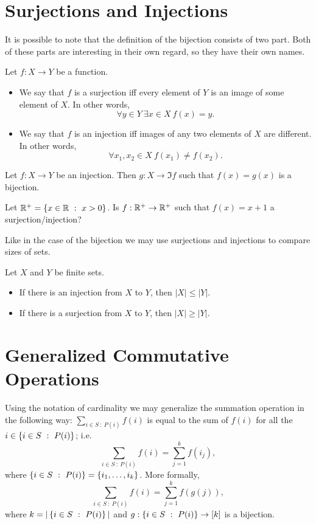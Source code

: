 \section{Surjections and Injections}

It is possible to note that the definition of the bijection consists of two part.
Both of these parts are interesting in their own regard, so they have their own
names.
\begin{definition}
    Let $f : X \to Y$ be a function.
    \begin{itemize}
        \item We say that $f$ is a surjection iff every element of $Y$ is an image
            of some element of $X$. In other words,
            \[
                \forall y \in Y~\exists x \in X\ f(x) = y.
            \]
        \item We say that $f$ is an injection iff images of any two elements
            of $X$ are different. In other words,
            \[
                \forall x_1, x_2 \in X\ f(x_1) \neq f(x_2).
            \]
    \end{itemize}
\end{definition}

\begin{remark}
    Let $f : X \to Y$ be an injection. Then $g : X \to \Im f$ such that
    $f(x) = g(x)$ is a bijection.
\end{remark}

\begin{exercise}
    Let $\R^+ = \set[x > 0]{x \in \R}$. Is $f : {\mathbb{R}}^+ \to {\mathbb{R}}^+$ such that
    $f(x) = x + 1$ a surjection/injection?
\end{exercise}

Like in the case of the bijection we may use surjections and injections to
compare sizes of sets.
\begin{theorem}
\label{theorem:injections-surjections-inequalities}
    Let $X$ and $Y$ be finite sets.
    \begin{itemize}
        \item If there is an injection from $X$ to $Y$, then $|X| \le |Y|$.
        \item If there is a surjection from $X$ to $Y$, then $|X| \ge |Y|$.
    \end{itemize}
\end{theorem}

\section{Generalized Commutative Operations}
Using the notation of cardinality we may generalize the summation operation in
the following way: $\sum_{i \in S ~:~ P(i)} f(i)$ is equal to the sum of
$f(i)$ for all the $i \in \set[P(i)]{i \in S}$; i.e.
\[
    \sum_{i \in S ~:~ P(i)} f(i) = \sum_{j = 1}^k f(i_j),
\]
where $\set[P(i)]{i \in S} = \set{i_1, \dots, i_k}$. More formally,
\[
    \sum_{i \in S ~:~ P(i)} f(i) = \sum_{j = 1}^k f(g(j)),
\]
where $k = |\set[P(i)]{i \in S}|$ and $g : \set[P(i)]{i \in S} \to \range{k}$ is
a bijection.

